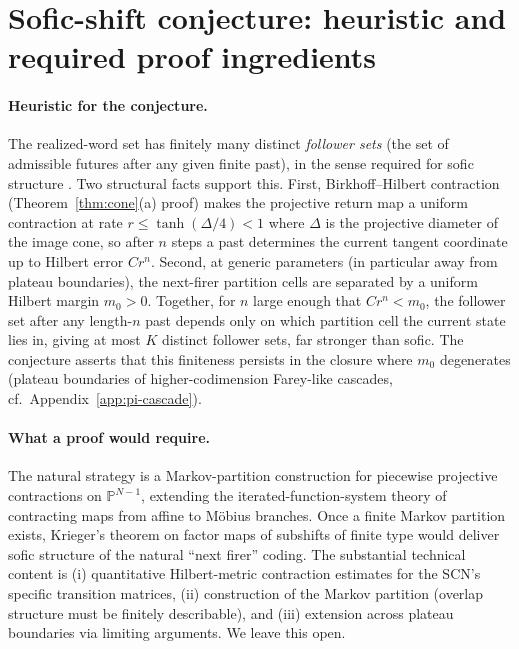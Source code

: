 \documentclass[12pt]{article}
\begin{document}
\section{Sofic-shift conjecture: heuristic and required proof ingredients}\label{app:sofic-heur}

\paragraph{Heuristic for the conjecture.}
The realized-word set has finitely many distinct \emph{follower sets} (the set of admissible futures after any given finite past), in the sense required for sofic structure \citep[Thm.~3.2.10]{lind2021introduction}. Two structural facts support this. First, Birkhoff--Hilbert contraction (Theorem~\ref{thm:cone}(a) proof) makes the projective return map a uniform contraction at rate $r\leq\tanh(\Delta/4)<1$ where $\Delta$ is the projective diameter of the image cone, so after $n$ steps a past determines the current tangent coordinate up to Hilbert error $Cr^n$. Second, at generic parameters (in particular away from plateau boundaries), the next-firer partition cells are separated by a uniform Hilbert margin $m_0>0$. Together, for $n$ large enough that $Cr^n<m_0$, the follower set after any length-$n$ past depends only on which partition cell the current state lies in, giving at most $K$ distinct follower sets, far stronger than sofic. The conjecture asserts that this finiteness persists in the closure where $m_0$ degenerates (plateau boundaries of higher-codimension Farey-like cascades, cf.~Appendix~\ref{app:pi-cascade}).

\paragraph{What a proof would require.}
The natural strategy is a Markov-partition construction for piecewise projective contractions on $\mathbb{P}^{N-1}$, extending the iterated-function-system theory of contracting maps \citep{hutchinson1981fractals,falconer2013fractal} from affine to M\"obius branches. Once a finite Markov partition exists, Krieger's theorem on factor maps of subshifts of finite type \citep{lind2021introduction} would deliver sofic structure of the natural ``next firer'' coding. The substantial technical content is (i) quantitative Hilbert-metric contraction estimates for the SCN's specific transition matrices, (ii) construction of the Markov partition (overlap structure must be finitely describable), and (iii) extension across plateau boundaries via limiting arguments. We leave this open.
%
\end{document}
